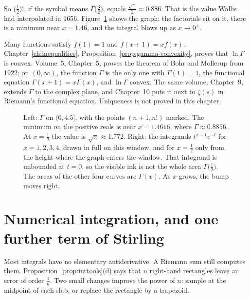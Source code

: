 So $\bigl(\frac12\bigr)!$, if the symbol means $\Gamma\bigl(\frac32\bigr)$, equals $\frac{\sqrt\pi}2\approx0.886$. That is the value Wallis had interpolated in 1656. Figure~\ref{fig:gammafn} shows the graph: the factorials sit on it, there is a minimum near $x=1.46$, and the integral blows up as $x\to0^+$.

Many functions satisfy $f(1)=1$ and $f(x+1)=xf(x)$. Chapter~\ref{ch:inequalities}, Proposition~\ref{prop:gamma-convexity}, proves that $\ln\Gamma$ is convex. Volume~5, Chapter~5, proves the theorem of Bohr and Mollerup from 1922: on $(0,\infty)$, the function $\Gamma$ is the only one with $\Gamma(1)=1$, the functional equation $\Gamma(x+1)=x\Gamma(x)$, and $\ln\Gamma$ convex. The same volume, Chapter~9, extends $\Gamma$ to the complex plane, and Chapter~10 puts it next to $\zeta(s)$ in Riemann's functional equation. Uniqueness is not proved in this chapter.

\begin{figure}[ht]
\centering
{}
\caption{Left: $\Gamma$ on $(0,4.5]$, with the points $(n+1,n!)$ marked. The minimum on the positive reals is near $x=1.4616$, where $\Gamma\approx0.8856$. At $x=\frac12$ the value is $\sqrt\pi\approx1.772$. Right: the integrands $t^{x-1}e^{-t}$ for $x=1,2,3,4$, drawn in full on this window, and for $x=\frac12$ only from the height where the graph enters the window. That integrand is unbounded at $t=0$, so the visible ink is not the whole area $\Gamma\bigl(\frac12\bigr)$. The areas of the other four curves are $\Gamma(x)$. As $x$ grows, the bump moves right.}
\label{fig:gammafn}
\end{figure}

\section{Numerical integration, and one further term of Stirling}

Most integrals have no elementary antiderivative. A Riemann sum still computes them. Proposition~\ref{prop:inttools}(d) says that $n$ right-hand rectangles leave an error of order $\frac1n$. Two small changes improve the power of $n$: sample at the midpoint of each slab, or replace the rectangle by a trapezoid.


